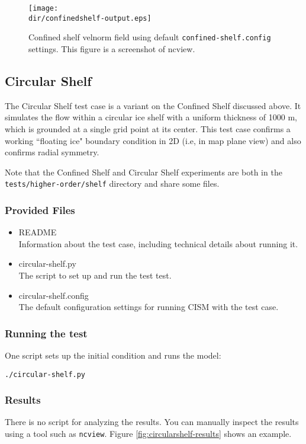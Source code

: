 \begin{figure}[H!]
	\centering
	\texttt{[image: \\dir/confinedshelf-output.eps]}
	\caption{Confined shelf velnorm field using default \texttt{confined-shelf.config} settings. This figure is a screenshot of ncview.}
	\label{fig:confinedshelf-results}
\end{figure}
\FloatBarrier

\subsection{Circular Shelf}
The Circular Shelf test case is a variant on the Confined Shelf discussed above. It simulates the flow within a circular ice shelf with a uniform thickness
of 1000 m, which is grounded at a single grid point at its center. This test case confirms a working ``floating ice" boundary condition
in 2D (i.e, in map plane view) and also confirms radial symmetry. 

Note that the Confined Shelf and Circular Shelf experiments are both in the 
\texttt{tests/higher-order/shelf} directory and share some files.

\subsubsection{Provided Files}

\begin{itemize}
	\item README \\
		Information about the test case, including technical details about running it.
	\item circular-shelf.py \\
		The script to set up and run the test test.
	\item circular-shelf.config \\
          The default configuration settings for running CISM with the test case.
\end{itemize}

\subsubsection{Running the test}
One script sets up the initial condition and runs the model:

\texttt{./circular-shelf.py}

\subsubsection{Results}
There is no  script for analyzing the results.
You can manually inspect the results using a tool such as \texttt{ncview}.
Figure \ref{fig:circularshelf-results} shows an example.

